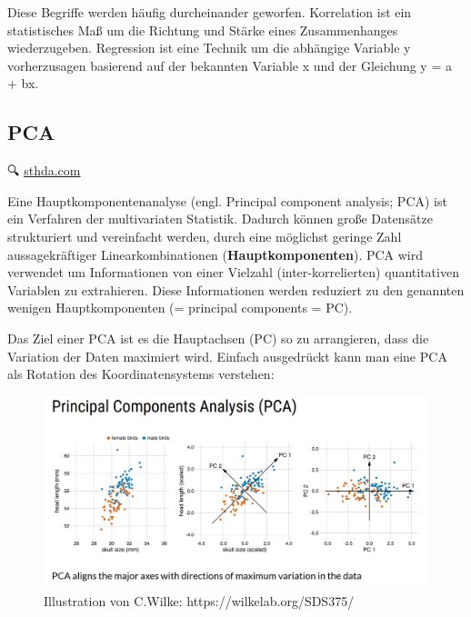 \documentclass[
]{article}
\begin{document}
Diese Begriffe werden häufig durcheinander geworfen. Korrelation ist ein statistisches Maß um die Richtung und Stärke eines Zusammenhanges wiederzugeben. Regression ist eine Technik um die abhängige Variable y vorherzusagen basierend auf der bekannten Variable x und der Gleichung y = a + bx.

\hypertarget{pca}{%
\subsection{PCA}\label{pca}}

🔍 \href{http://www.sthda.com/english/articles/31-principal-component-methods-in-r-practical-guide/112-pca-principal-component-analysis-essentials/}{sthda.com}

Eine Hauptkomponentenanalyse (engl. Principal component analysis; PCA) ist ein Verfahren der multivariaten Statistik. Dadurch können große Datensätze strukturiert und vereinfacht werden, durch eine möglichst geringe Zahl aussagekräftiger Linearkombinationen (\textbf{Hauptkomponenten}). PCA wird verwendet um Informationen von einer Vielzahl (inter-korrelierten) quantitativen Variablen zu extrahieren. Diese Informationen werden reduziert zu den genannten wenigen Hauptkomponenten (= principal components = PC).

Das Ziel einer PCA ist es die Hauptachsen (PC) so zu arrangieren, dass die Variation der Daten maximiert wird. Einfach ausgedrückt kann man eine PCA als Rotation des Koordinatensystems verstehen:

\begin{figure}

{\centering \includegraphics[width=1\linewidth]{images/046} 

}

\caption{Illustration von C.Wilke: https://wilkelab.org/SDS375/}\label{fig:unnamed-chunk-272}
\end{figure}
\end{document}
